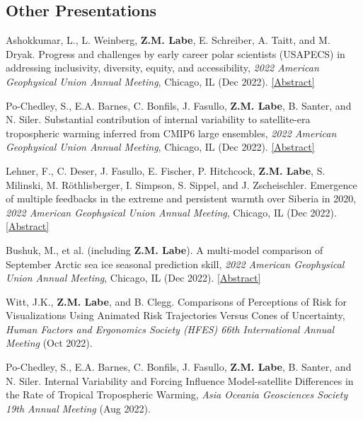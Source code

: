 \documentclass[margin,line,palatino,courier,10pt]{res}
\begin{document}
\begin{resume}
\section{\sc \textcolor{Cerulean}{\large{\textbf{Other Presentations}}}} 
\begin{etaremune}[leftmargin=0in,topsep=0in,parsep=0in]
\item Ashokkumar, L., L. Weinberg, \textbf{Z.M. Labe}, E. Schreiber, A. Taitt, and M. Dryak. Progress and challenges by early career polar scientists (USAPECS) in addressing inclusivity, diversity, equity, and accessibility, \textit{2022 American Geophysical Union Annual Meeting}, Chicago, IL (Dec 2022). \href{https://agu.confex.com/agu/fm22/meetingapp.cgi/Paper/1192493}{[Abstract]}
\item Po-Chedley, S., E.A. Barnes, C. Bonfils, J. Fasullo, \textbf{Z.M. Labe}, B. Santer, and N. Siler. Substantial contribution of internal variability to satellite-era tropospheric warming inferred from CMIP6 large ensembles, \textit{2022 American Geophysical Union Annual Meeting}, Chicago, IL (Dec 2022). \href{https://agu.confex.com/agu/fm22/meetingapp.cgi/Paper/1095614}{[Abstract]}
\item Lehner, F., C. Deser, J. Fasullo, E. Fischer, P. Hitchcock, \textbf{Z.M. Labe}, S. Milinski, M. Röthlisberger, I. Simpson, S. Sippel, and J. Zscheischler. Emergence of multiple feedbacks in the extreme and persistent warmth over Siberia in 2020, \textit{2022 American Geophysical Union Annual Meeting}, Chicago, IL (Dec 2022). \href{https://agu.confex.com/agu/fm22/meetingapp.cgi/Paper/1190729}{[Abstract]}
\item Bushuk, M., et al. (including \textbf{Z.M. Labe}). A multi-model comparison of September Arctic sea ice seasonal prediction skill, \textit{2022 American Geophysical Union Annual Meeting}, Chicago, IL (Dec 2022). \href{https://agu.confex.com/agu/fm22/meetingapp.cgi/Paper/1179488}{[Abstract]}
\item Witt, J.K., \textbf{Z.M. Labe}, and B. Clegg. Comparisons of Perceptions of Risk for Visualizations Using Animated Risk Trajectories Versus Cones of Uncertainty, \textit{Human Factors and Ergonomics Society (HFES) 66th International Annual Meeting} (Oct 2022).
\item Po-Chedley, S., E.A. Barnes, C. Bonfils, J. Fasullo, \textbf{Z.M. Labe}, B. Santer, and N. Siler. Internal Variability and Forcing Influence Model-satellite Differences in the Rate of Tropical Tropospheric Warming, \textit{Asia Oceania Geosciences Society 19th Annual Meeting} (Aug 2022).

\end{etaremune}
\end{resume}
\end{document}
